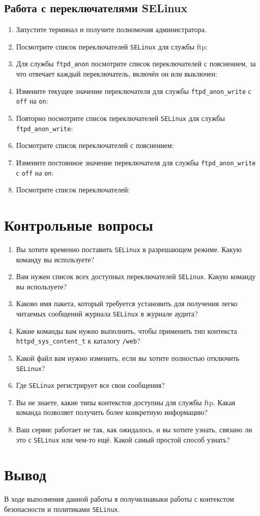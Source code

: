 \documentclass[12pt]{article}
\begin{document}
\subsection{Работа с переключателями SELinux}
\begin{enumerate}
	\item Запустите терминал и получите полномочия администратора.
	\item Посмотрите список переключателей \texttt{SELinux} для службы ftp:
	\item Для службы \texttt{ftpd\_anon} посмотрите список переключателей с пояснением, за что отвечает каждый переключатель, включён он или выключен:
	\item Измените текущее значение переключателя для службы \texttt{ftpd\_anon\_write} с \texttt{off} на \texttt{on}:
	\item Повторно посмотрите список переключателей \texttt{SELinux} для службы \texttt{ftpd\_anon\_write}:
	\item Посмотрите список переключателей с пояснением:
	\item Измените постоянное значение переключателя для службы \texttt{ftpd\_anon\_write} с \texttt{off} на \texttt{on}:
	\item Посмотрите список переключателей:
\end{enumerate}

\section{Контрольные вопросы}
\begin{enumerate}
	\item Вы хотите временно поставить \texttt{SELinux} в разрешающем режиме. Какую команду вы используете?
	\item Вам нужен список всех доступных переключателей \texttt{SELinux}. Какую команду вы используете?
	\item Каково имя пакета, который требуется установить для получения легко читаемых сообщений журнала \texttt{SELinux} в журнале аудита?
	\item Какие команды вам нужно выполнить, чтобы применить тип контекста \texttt{httpd\_sys\_content\_t} к каталогу \texttt{/web}?
	\item Какой файл вам нужно изменить, если вы хотите полностью отключить \texttt{SELinux}?
	\item Где \texttt{SELinux} регистрирует все свои сообщения?
	\item Вы не знаете, какие типы контекстов доступны для службы ftp. Какая команда позволяет получить более конкретную информацию?
	\item Ваш сервис работает не так, как ожидалось, и вы хотите узнать, связано ли это с \texttt{SELinux} или чем-то ещё. Какой самый простой способ узнать?
\end{enumerate}

\section{Вывод}
В ходе выполнения данной работы я получилнавыки работы с контекстом безопасности и политиками \texttt{SELinux}.
\end{document}
